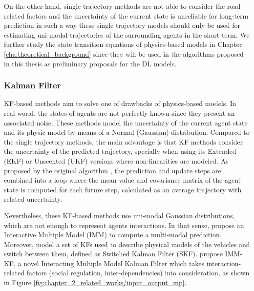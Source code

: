 
On the other hand, single trajectory methods are not able to consider the road-related factors and the uncertainty of the current state is unreliable for long-term prediction in such a way these single trajectory models should only be used for estimating uni-modal trajectories of the surrounding agents in the short-term. We further study the state transition equations of physics-based models in Chapter \ref{cha:theoretical_background} since they will be used in the algorithms proposed in this thesis as preliminary proposals for the \ac{DL} models.

\subsubsection{Kalman Filter}
\label{subsubsec:2_kalman_filter_mp}

\acf{KF}-based methods aim to solve one of drawbacks of physics-based models. In real-world, the states of agents are not perfectly known since they present an associated noise. These methods model the uncertainty of the current agent state and its physic model by means of a Normal (Gaussian) distribution. Compared to the single trajectory methods, the main advantage is that KF methods consider the uncertainty of the predicted trajectory, specially when using its Extended (EKF) or Unscented (UKF) versions where non-linearities are modeled. As proposed by the original algorithm \cite{kalman1960new}, the prediction and update steps are combined into a loop where the mean value and covariance matrix of the agent state is computed for each future step, calculated as an average trajectory with related uncertainty. 

Nevertheless, these \ac{KF}-based methods use uni-modal Gaussian distributions, which are not enough to represent agents interactions. In that sense, \cite{kaempchen2004imm} propose an Interactive Multiple Model (IMM) to compute a multi-modal prediction. Moreover, \cite{jin2015switched} model a set of \acp{KF} used to describe physical models of the vehicles and switch between them, defined as Switched Kalman Filter (SKF). \cite{lefkopoulos2020interaction} propose IMM-KF, a novel Interacting Multiple Model Kalman Filter which takes interaction-related factors (social regulation, inter-dependencies) into consideration, as shown in Figure \ref{fig:chapter_2_related_works/input_output_mp}.

